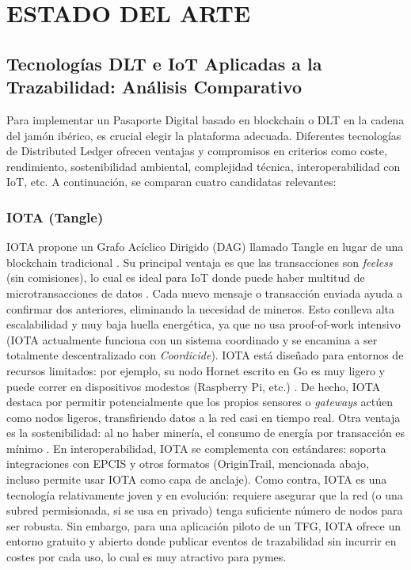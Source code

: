 \chapter{ESTADO DEL ARTE}\label{ch:estado}

\section{Tecnologías DLT e IoT Aplicadas a la Trazabilidad: Análisis Comparativo}\label{sec:estado-tecnologias}
Para implementar un Pasaporte Digital basado en blockchain o DLT en la cadena del jamón ibérico, es crucial elegir la plataforma adecuada. Diferentes tecnologías de Distributed Ledger ofrecen ventajas y compromisos en criterios como coste, rendimiento, sostenibilidad ambiental, complejidad técnica, interoperabilidad con IoT, etc. A continuación, se comparan cuatro candidatas relevantes:
\subsection{IOTA (Tangle)}\label{sec:estado-iota}
IOTA propone un Grafo Acíclico Dirigido (DAG) llamado Tangle en lugar de una blockchain tradicional \cite{pullo_integrating_2024-1}. Su principal ventaja es que las transacciones son \textit{feeless} (sin comisiones), lo cual es ideal para IoT donde puede haber multitud de microtransacciones de datos . Cada nuevo mensaje o transacción enviada ayuda a confirmar dos anteriores, eliminando la necesidad de mineros. Esto conlleva alta escalabilidad y muy baja huella energética, ya que no usa proof-of-work intensivo (IOTA actualmente funciona con un sistema coordinado y se encamina a ser totalmente descentralizado con \textit{Coordicide}). IOTA está diseñado para entornos de recursos limitados: por ejemplo, su nodo Hornet escrito en Go es muy ligero y puede correr en dispositivos modestos (Raspberry Pi, etc.) . De hecho, IOTA destaca por permitir potencialmente que los propios sensores o \textit{gateways} actúen como nodos ligeros, transfiriendo datos a la red casi en tiempo real. Otra ventaja es la sostenibilidad: al no haber minería, el consumo de energía por transacción es mínimo . En interoperabilidad, IOTA se complementa con estándares: soporta integraciones con EPCIS y otros formatos (OriginTrail, mencionada abajo, incluso permite usar IOTA como capa de anclaje). Como contra, IOTA es una tecnología relativamente joven y en evolución: requiere asegurar que la red (o una subred permisionada, si se usa en privado) tenga suficiente número de nodos para ser robusta. Sin embargo, para una aplicación piloto de un TFG, IOTA ofrece un entorno gratuito y abierto donde publicar eventos de trazabilidad sin incurrir en costes por cada uso, lo cual es muy atractivo para pymes.

